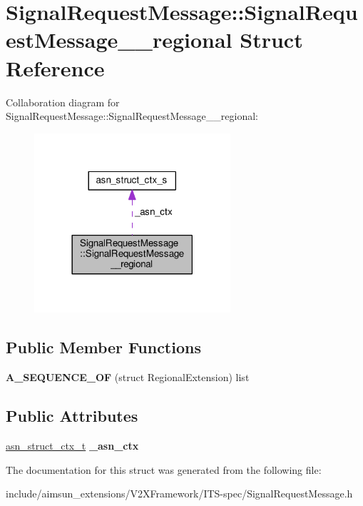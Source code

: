 \hypertarget{structSignalRequestMessage_1_1SignalRequestMessage____regional}{}\section{Signal\+Request\+Message\+:\+:Signal\+Request\+Message\+\_\+\+\_\+regional Struct Reference}
\label{structSignalRequestMessage_1_1SignalRequestMessage____regional}


Collaboration diagram for Signal\+Request\+Message\+:\+:Signal\+Request\+Message\+\_\+\+\_\+regional\+:\nopagebreak
\begin{figure}[H]
\begin{center}
\leavevmode
\includegraphics[width=206pt]{structSignalRequestMessage_1_1SignalRequestMessage____regional__coll__graph}
\end{center}
\end{figure}
\subsection*{Public Member Functions}
\begin{DoxyCompactItemize}
\item 
{\bfseries A\+\_\+\+S\+E\+Q\+U\+E\+N\+C\+E\+\_\+\+OF} (struct Regional\+Extension) list\hypertarget{structSignalRequestMessage_1_1SignalRequestMessage____regional_a0d605ba1fd7f3e4b376aff7ce921bf54}{}\label{structSignalRequestMessage_1_1SignalRequestMessage____regional_a0d605ba1fd7f3e4b376aff7ce921bf54}

\end{DoxyCompactItemize}
\subsection*{Public Attributes}
\begin{DoxyCompactItemize}
\item 
\hyperlink{structasn__struct__ctx__s}{asn\+\_\+struct\+\_\+ctx\+\_\+t} {\bfseries \+\_\+asn\+\_\+ctx}\hypertarget{structSignalRequestMessage_1_1SignalRequestMessage____regional_a4234283653a63e8c6b24f28088279b62}{}\label{structSignalRequestMessage_1_1SignalRequestMessage____regional_a4234283653a63e8c6b24f28088279b62}

\end{DoxyCompactItemize}


The documentation for this struct was generated from the following file\+:\begin{DoxyCompactItemize}
\item 
include/aimsun\+\_\+extensions/\+V2\+X\+Framework/\+I\+T\+S-\/spec/Signal\+Request\+Message.\+h\end{DoxyCompactItemize}

